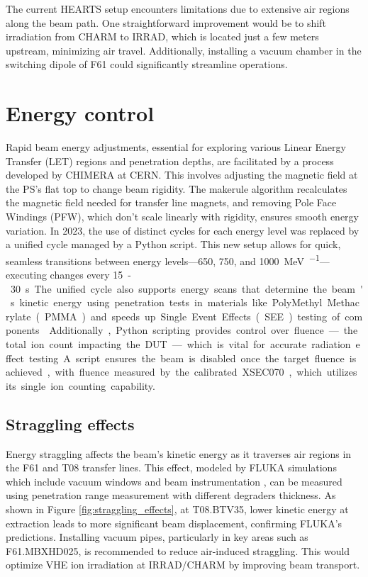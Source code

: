 \documentclass[a4paper,
               biblatex,     %
               ]{jacow}
\begin{document}
The current HEARTS setup encounters limitations due to extensive air regions along the beam path. One straightforward improvement would be to shift irradiation from CHARM to IRRAD, which is located just a few meters upstream, minimizing air travel. Additionally, installing a vacuum chamber in the switching dipole of F61 could significantly streamline operations.






\section{Energy control}

Rapid beam energy adjustments, essential for exploring various Linear Energy Transfer (LET) regions and penetration depths, are facilitated by a process developed by CHIMERA at CERN. This involves adjusting the magnetic field at the PS's flat top to change beam rigidity. The makerule algorithm recalculates the magnetic field needed for transfer line magnets, and removing Pole Face Windings (PFW), which don't scale linearly with rigidity, ensures smooth energy variation. In 2023, the use of distinct cycles for each energy level was replaced by a unified cycle managed by a Python script. This new setup allows for quick, seamless transitions between energy levels—\SI{650}{}, \SI{750}{}, and \SI{1000}{\mega\electronvolt\per\nucleon}—executing changes every \SI{15}-\SI{30}{\second}. The unified cycle also supports energy scans that determine the beam's kinetic energy using penetration tests in materials like PolyMethyl Methacrylate (PMMA) and speeds up Single Event Effects (SEE) testing of components \cite{noauthor_hearts_nodate}. Additionally, Python scripting provides control over fluence—the total ion count impacting the DUT—which is vital for accurate radiation effect testing. A script ensures the beam is disabled once the target fluence is achieved, with fluence measured by the calibrated XSEC070, which utilizes its single ion counting capability.

\subsection{Straggling effects}
Energy straggling affects the beam's kinetic energy as it traverses air regions in the F61 and T08 transfer lines. This effect, modeled by FLUKA simulations which include vacuum windows and beam instrumentation \cite{battistoni_overview_2015}, can be measured using penetration range measurement with different degraders thickness. As shown in Figure \ref{fig:straggling_effects}, at T08.BTV35, lower kinetic energy at extraction leads to more significant beam displacement, confirming FLUKA's predictions. Installing vacuum pipes, particularly in key areas such as F61.MBXHD025, is recommended to reduce air-induced straggling. This would optimize VHE ion irradiation at IRRAD/CHARM by improving beam transport.
\end{document}
